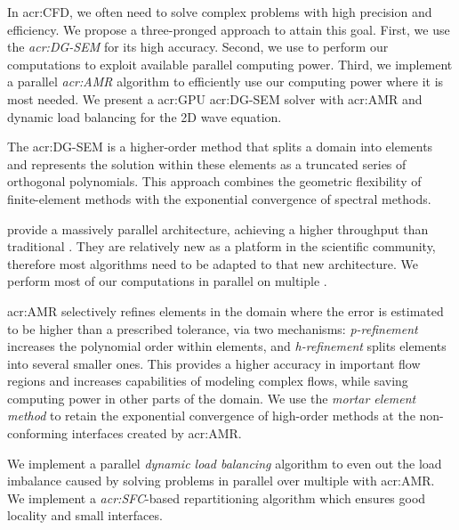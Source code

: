 \begin{adjustwidth}{-0.5in}{-0.5in}

\hspace{\parindent} %
In \acrlong{acr:CFD}, we often need to solve complex problems with high precision and efficiency. We
propose a three-pronged approach to attain this goal. First, we use the
\textit{\acrfull{acr:DG-SEM}} for its high accuracy. Second, we use \textit{} to
perform our computations to exploit available parallel computing power. Third, we implement a
parallel \textit{\acrfull{acr:AMR}} algorithm to efficiently use our computing power where it is
most needed. We present a \acrshort{acr:GPU} \acrshort{acr:DG-SEM} solver with \acrshort{acr:AMR}
and dynamic load balancing for the 2D wave equation. 

The \acrshort{acr:DG-SEM} is a higher-order method that splits a domain into elements and represents
the solution within these elements as a truncated series of orthogonal polynomials. This approach
combines the geometric flexibility of finite-element methods with the exponential convergence of
spectral methods.

 provide a massively parallel architecture, achieving a higher throughput than
traditional . They are relatively new as a platform in the scientific community,
therefore most algorithms need to be adapted to that new architecture. We perform most of our
computations in parallel on multiple .

\Acrshort{acr:AMR} selectively refines elements in the domain where the error is estimated to be
higher than a prescribed tolerance, via two mechanisms: \textit{p-refinement} increases the
polynomial order within elements, and \textit{h-refinement} splits elements into several smaller
ones. This provides a higher accuracy in important flow regions and increases capabilities of
modeling complex flows, while saving computing power in other parts of the domain. We use the
\textit{mortar element method} to retain the exponential convergence of high-order methods at the
non-conforming interfaces created by \acrshort{acr:AMR}.

We implement a parallel \textit{dynamic load balancing} algorithm to even out the load imbalance
caused by solving problems in parallel over multiple  with \acrshort{acr:AMR}.
We implement a \textit{\acrlong{acr:SFC}}-based repartitioning algorithm which ensures good locality
and small interfaces.


\end{adjustwidth}

